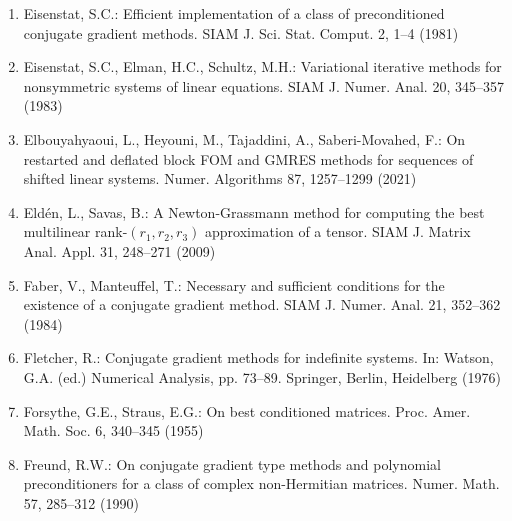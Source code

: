 \begin{enumerate}[label=\arabic*.,ref=\arabic*,leftmargin=3em]
\item\label{bib:source-53}Eisenstat, S.C.: Efficient implementation of a class of preconditioned conjugate gradient methods. SIAM J. Sci. Stat. Comput. 2, 1–4 (1981)

\item\label{bib:source-54}Eisenstat, S.C., Elman, H.C., Schultz, M.H.: Variational iterative methods for nonsymmetric systems of linear equations. SIAM J. Numer. Anal. 20, 345–357 (1983)

\item\label{bib:source-55}Elbouyahyaoui, L., Heyouni, M., Tajaddini, A., Saberi-Movahed, F.: On restarted and deflated block FOM and GMRES methods for sequences of shifted linear systems. Numer. Algorithms 87, 1257–1299 (2021)

\item\label{bib:source-56}Eldén, L., Savas, B.: A Newton-Grassmann method for computing the best multilinear rank-$(r_1,r_2,r_3)$ approximation of a tensor. SIAM J. Matrix Anal. Appl. 31, 248–271 (2009)

\item\label{bib:source-57}Faber, V., Manteuffel, T.: Necessary and sufficient conditions for the existence of a conjugate gradient method. SIAM J. Numer. Anal. 21, 352–362 (1984)

\item\label{bib:source-58}Fletcher, R.: Conjugate gradient methods for indefinite systems. In: Watson, G.A. (ed.) Numerical Analysis, pp. 73–89. Springer, Berlin, Heidelberg (1976)

\item\label{bib:source-59}Forsythe, G.E., Straus, E.G.: On best conditioned matrices. Proc. Amer. Math. Soc. 6, 340–345 (1955)

\item\label{bib:source-60}Freund, R.W.: On conjugate gradient type methods and polynomial preconditioners for a class of complex non-Hermitian matrices. Numer. Math. 57, 285–312 (1990)


\end{enumerate}
